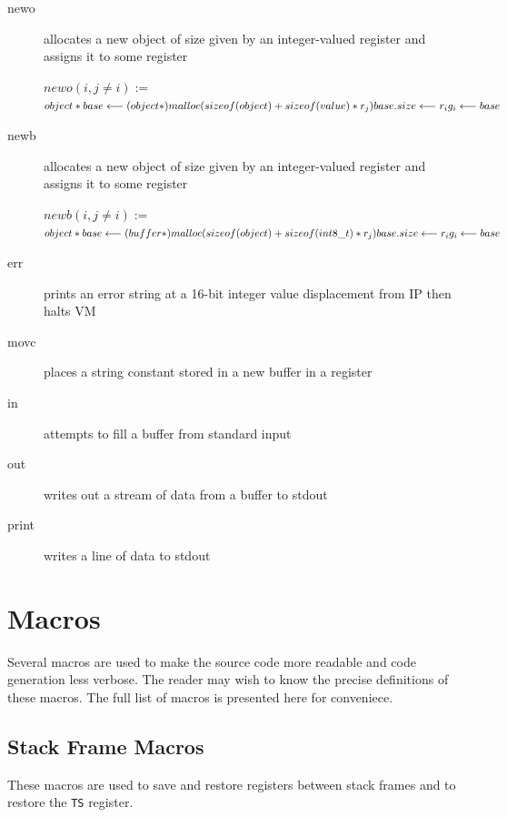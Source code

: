 \documentclass[english,a4paper,12pt]{report}
\begin{document}
\begin{description}
	\item[newo] allocates a new object of size given by an 
	integer-valued
	register and assigns it to some register
	
	$ newo(i, j \neq i) := $ \\
	$  object *base \longleftarrow (object*)malloc(sizeof(object) + 
	sizeof(value)* r_j) \\
	base.size \longleftarrow r_i\\
	g_i \longleftarrow base \\ $
	
	\item[newb]{} allocates a new object of size given by an
	integer-valued register and assigns it to some register
	
	$ newb(i, j \neq i) := $ \\
	$  object *base \longleftarrow (buffer*)malloc(sizeof(object) + 
	sizeof(int8\_t)* r_j) \\
	base.size \longleftarrow r_i\\
	g_i \longleftarrow base \\ $
	
	\item[err] prints an error string at a 16-bit integer value
	displacement from IP then halts VM
	
	\item[movc] places a string constant stored in a new buffer in a register
	
	\item[in] attempts to fill a buffer from standard input
	
	\item[out] writes out a stream of data from a buffer to stdout
	
	\item[print] writes a line of data to stdout
	
\end{description}
\chapter{Macros}

Several macros are used to make the source code more readable and code
generation less verbose. The reader may wish to know the precise
definitions of these macros. The full list of macros is presented here
for conveniece.

\section{Stack Frame Macros}
\label{sec:stackframemacros}
These macros are used to save and restore registers between stack
frames and to restore the \verb|TS| register.
\end{document}
